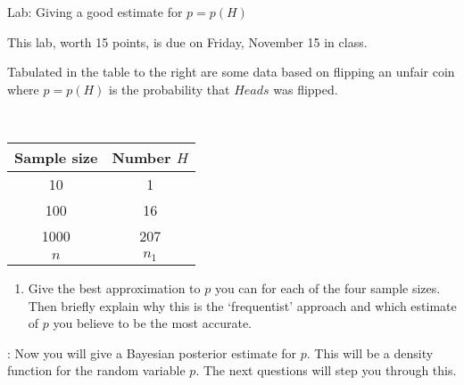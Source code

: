 \documentclass{report}
\begin{document}
{\bf \centerline{{\large Lab: Giving a good estimate for $p = p(H)$}}}

\smallskip
\centerline{This lab, worth 15 points, is due on Friday, November 15 in class.}

\bigskip

\noindent \begin{minipage}{8cm}

Tabulated in the table to the right are some data based on flipping an unfair coin where
$p = p(H)$ is the probability that $Heads$ was flipped. 

\end{minipage}
%
\begin{minipage}{8cm}
\hskip 1cm \  \begin{tabular}{c|c}
Sample size & Number $H$ \\
\hline\hline
10 & 1\\
100 & 16\\
1000 & 207\\
$n$ & $n_1$
\end{tabular}
\end{minipage}

\smallskip


\begin{enumerate}

\item Give the best approximation to $p$ you can for each of the four sample sizes.  Then
briefly explain why this is the `frequentist' approach and which estimate of $p$ you believe to be the
most accurate.


\end{enumerate}
\smallskip

:  Now you will give a Bayesian posterior estimate for $p$.  This
will be a density function for the random variable $p$.  The next questions will step you through this.
\end{document}
